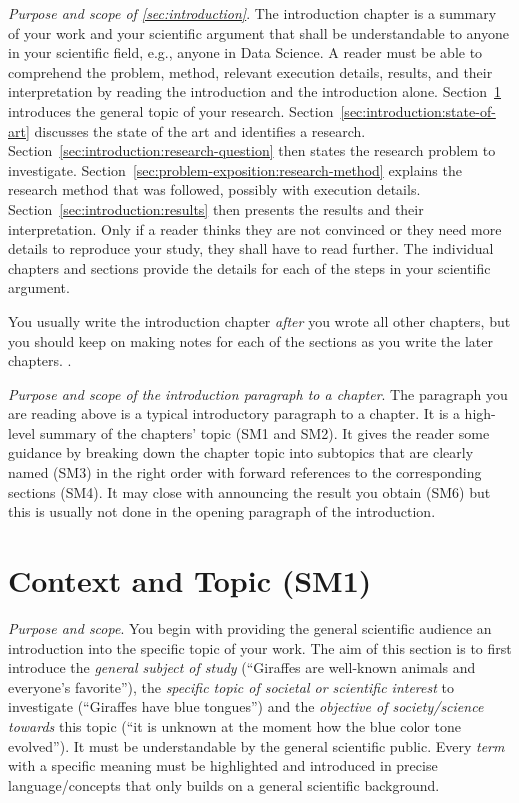 \documentclass[
  numbers=autoendperiod,
  ngerman,  %
  a4paper,  %
  twoside,  %
  bibliography=totoc,
  headsepline,
  cleardoublepage=empty,
  parskip=half,
  draft=false
]{scrbook}
\theoremstyle{break}
\begin{document}
\emph{Purpose and scope of \cref{sec:introduction}}.
The introduction chapter is a summary of your work and your scientific argument that shall be understandable to anyone in your scientific field, e.g., anyone in Data Science.
A reader must be able to comprehend the problem, method, relevant execution details, results, and their interpretation by reading the introduction and the introduction alone.
Section~\ref{sec:introduction:topic} introduces the general topic of your research.
Section~\ref{sec:introduction:state-of-art} discusses the state of the art and identifies a research.
Section~\ref{sec:introduction:research-question} then states the research problem to investigate.
Section~\ref{sec:problem-exposition:research-method} explains the research method that was followed, possibly with execution details.
Section~\ref{sec:introduction:results} then presents the results and their interpretation.
Only if a reader thinks they are not convinced or they need more details to reproduce your study, they shall have to read further.
The individual chapters and sections provide the details for each of the steps in your scientific argument.

You usually write the introduction chapter \emph{after} you wrote all other chapters, but you should keep on making notes for each of the sections as you write the later chapters.
.

\emph{Purpose and scope of the introduction paragraph to a chapter}.
The paragraph you are reading above is a typical introductory paragraph to a chapter.
It is a high-level summary of the chapters' topic (SM1 and SM2).
It gives the reader some guidance by breaking down the chapter topic into subtopics that are clearly named (SM3) in the right order with forward references to the corresponding sections (SM4).
It may close with announcing the result you obtain (SM6) but this is usually not done in the opening paragraph of the introduction.

\section{Context and Topic (SM1)}\label{sec:introduction:topic}

\emph{Purpose and scope}.
You begin with providing the general scientific audience an introduction into the specific topic of your work.
The aim of this section is to first introduce the \emph{general subject of study} (``Giraffes are well-known animals and everyone's favorite''), the \emph{specific topic of societal or scientific interest} to investigate (``Giraffes have blue tongues'') and the \emph{objective of society/science towards} this topic (``it is unknown at the moment how the blue color tone evolved'').
It must be understandable by the general scientific public.
Every \emph{term} with a specific meaning must be highlighted and introduced in precise language/concepts that only builds on a general scientific background.
\end{document}

